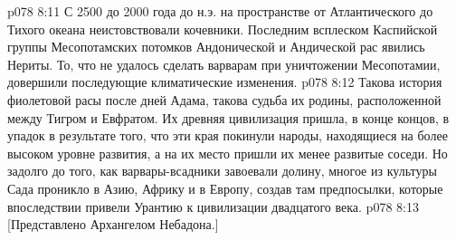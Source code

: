 \vs p078 8:11 С 2500 до 2000 года до н.э. на пространстве от Атлантического до Тихого океана неистовствовали кочевники. Последним всплеском Каспийской группы Месопотамских потомков Андонической и Андической рас явились Нериты. То, что не удалось сделать варварам при уничтожении Месопотамии, довершили последующие климатические изменения.
\vs p078 8:12 \pc Такова история фиолетовой расы после дней Адама, такова судьба их родины, расположенной между Тигром и Евфратом. Их древняя цивилизация пришла, в конце концов, в упадок в результате того, что эти края покинули народы, находящиеся на более высоком уровне развития, а на их место пришли их менее развитые соседи. Но задолго до того, как варвары\hyp{}всадники завоевали долину, многое из культуры Сада проникло в Азию, Африку и в Европу, создав там предпосылки, которые впоследствии привели Урантию к цивилизации двадцатого века.
\vsetoff
\vs p078 8:13 [Представлено Архангелом Небадона.]
